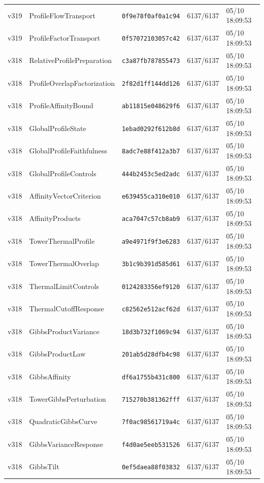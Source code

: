 \documentclass[11pt]{article}
\theoremstyle{definition}\newtheorem{deriv}{Derivação}
\begin{document}
{\begin{longtable}{@{}lllll@{}}
v319 & ProfileFlowTransport & \texttt{0f9e78f0af0a1c94} & 6137/6137 & 05/10 18:09:53 \\
v319 & ProfileFactorTransport & \texttt{0f57072103057c42} & 6137/6137 & 05/10 18:09:53 \\
v318 & RelativeProfilePreparation & \texttt{c3a87fb787855473} & 6137/6137 & 05/10 18:09:53 \\
v318 & ProfileOverlapFactorization & \texttt{2f82d1ff144dd126} & 6137/6137 & 05/10 18:09:53 \\
v318 & ProfileAffinityBound & \texttt{ab11815e048629f6} & 6137/6137 & 05/10 18:09:53 \\
v318 & GlobalProfileState & \texttt{1ebad0292f612b8d} & 6137/6137 & 05/10 18:09:53 \\
v318 & GlobalProfileFaithfulness & \texttt{8adc7e88f412a3b7} & 6137/6137 & 05/10 18:09:53 \\
v318 & GlobalProfileControls & \texttt{444b2453c5ed2adc} & 6137/6137 & 05/10 18:09:53 \\
v318 & AffinityVectorCriterion & \texttt{e639455ca310e010} & 6137/6137 & 05/10 18:09:53 \\
v318 & AffinityProducts & \texttt{aca7047c57cb8ab9} & 6137/6137 & 05/10 18:09:53 \\
v318 & TowerThermalProfile & \texttt{a9e4971f9f3e6283} & 6137/6137 & 05/10 18:09:53 \\
v318 & TowerThermalOverlap & \texttt{3b1c9b391d585d61} & 6137/6137 & 05/10 18:09:53 \\
v318 & ThermalLimitControls & \texttt{0124283356ef9120} & 6137/6137 & 05/10 18:09:53 \\
v318 & ThermalCutoffResponse & \texttt{c82562e512acf62d} & 6137/6137 & 05/10 18:09:53 \\
v318 & GibbsProductVariance & \texttt{18d3b732f1069c94} & 6137/6137 & 05/10 18:09:53 \\
v318 & GibbsProductLaw & \texttt{201ab5d28dfb4c98} & 6137/6137 & 05/10 18:09:53 \\
v318 & GibbsAffinity & \texttt{df6a1755b431c800} & 6137/6137 & 05/10 18:09:53 \\
v318 & TowerGibbsPerturbation & \texttt{715270b381362fff} & 6137/6137 & 05/10 18:09:53 \\
v318 & QuadraticGibbsCurve & \texttt{7f0ac98561719a4c} & 6137/6137 & 05/10 18:09:53 \\
v318 & GibbsVarianceResponse & \texttt{f4d0ae5eeb531526} & 6137/6137 & 05/10 18:09:53 \\
v318 & GibbsTilt & \texttt{0ef5daea88f03832} & 6137/6137 & 05/10 18:09:53 \\

\end{longtable}}
\end{document}

